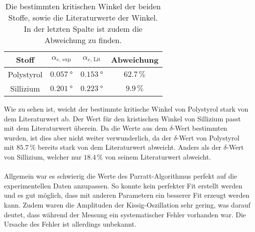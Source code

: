 \begin{table}
    \centering
    \caption{Die bestimmten kritischen Winkel der beiden Stoffe, sowie die Literaturwerte der Winkel. In der letzten Spalte ist zudem die Abweichung zu finden.}
    \begin{tabular}{cccc}
        \toprule
        Stoff & $\alpha_\text{c, exp}$ & $\alpha_\text{c, Lit}$ & Abweichung \\
        \midrule
        Polystyrol  &$\SI{0.057}{\degree}$ &$\SI{0.153}{\degree}$ & $62.7\,\%$ \\
        Sillizium &$\SI{0.201}{\degree}$ & $\SI{0.223}{\degree}$ & $9.9 \, \% $ \\
        \bottomrule
    \end{tabular}
    \label{tab:disk_kritwinkel}
\end{table}
Wie zu sehen ist, weicht der bestimmte kritische Winkel von Polystyrol stark von dem Literaturwert ab.
Der Wert für den kristischen Winkel von Sillizium passt mit dem Literaturwert überein.
Da die Werte aus dem $\delta$-Wert bestimmten wurden, ist dies aber nicht weiter verwunderlich, da der $\delta$-Wert von Polystyrol mit $85.7\,\%$ bereits stark von dem Literaturwert abweicht.
Anders als der $\delta$-Wert von Sillizium, welcher nur $18.4\,\%$ von seinem Literaturwert abweicht.
\\\\
Allgemein war es schwierig die Werte des Parratt-Algorithmus perfekt auf die experimentellen Daten anzupassen.
So konnte kein perfekter Fit erstellt werden und es gut möglich, dass mit anderen Parametern ein besserer Fit erzeugt werden kann.
Zudem waren die Amplituden der Kissig-Oszillation sehr gering, was darauf deutet, dass während der Messung ein systematischer Fehler vorhanden war.
Die Ursache des Fehler ist allerdings unbekannt.